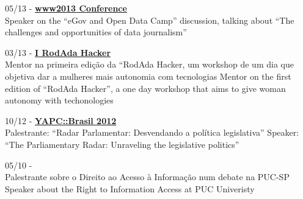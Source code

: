 \documentclass[]{friggeri-cv}
\begin{document}
05/13 - \href{http://www2013.org/}{\textbf{www2013 Conference}}\\
%
{Speaker on the ``eGov and Open Data Camp'' discussion, talking about ``The challenges and opportunities of data journalism''}

03/13 - \href{http://rodadahacker.com/}{\textbf{I RodAda Hacker}}\\
%
{Mentor na primeira edição da ``RodAda Hacker, um workshop de um dia que objetiva dar a mulheres mais autonomia com tecnologias}%
{Mentor on the first edition of ``RodAda Hacker'', a one day workshop that aims to give woman autonomy with techonologies}

10/12 - \href{http://yapcbrasil.org.br/2012/talk/110}{\textbf{YAPC::Brasil 2012}}\\
%
{Palestrante: ``Radar Parlamentar: Desvendando a política legislativa''}%
{Speaker: ``The Parliamentary Radar: Unraveling the legislative politics''}

05/10 - \href{http://artigo19.org/infoedireitoseu/?p=560}{\textbf{}}\\
%
{Palestrante sobre o Direito ao Acesso à Informação num debate na PUC-SP}%
{Speaker about the Right to Information Access at PUC Univeristy}
%
%
%
%
% 
\end{document}
